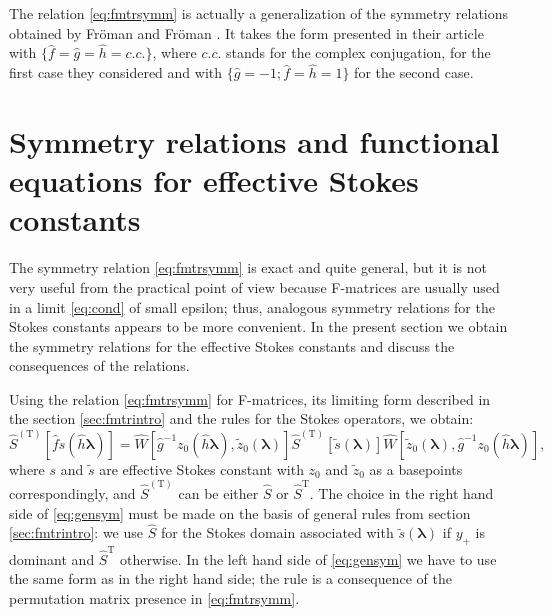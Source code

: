 \documentclass[atmp]{ipart_v1}
\def\lmbd{\bm{\lambda}}
\def\f{\hat{f}}
\def\g{\hat{g}}
\def\h{\hat{h}}
\def\S{\widehat{S}}
\def\W{\widehat{W}}
\def\T{\mathrm{T}}
\def\unity{1}
\newcommand\eref[1]{\eqref{#1}}
\newcommand\sref[1]{section \ref{#1}}
\begin{document}
The relation \eref{eq:fmtrsymm} is actually a generalization of the symmetry relations obtained by
Fr\"oman and Fr\"oman \cite{frpaper}. It takes the form presented in their article
with $\{\f = \g = \h = c.c.\}$, where $c.c.$ stands for the complex conjugation, for the
first case they considered and with $\{\g = -\unity; \f = \h = \unity\}$ for the second case.
















\section{Symmetry relations and functional equations for effective Stokes constants \label{sec:scsymm}}




The symmetry relation \eref{eq:fmtrsymm} is exact and quite general, but it is not very useful
from the practical point of view because F-matrices are usually used in a limit \eref{eq:cond} of
small epsilon; thus, analogous symmetry relations for the Stokes constants appears to be more
convenient. In the present section we obtain the symmetry relations for the effective Stokes constants 
and discuss the consequences of the relations.

Using the relation \eref{eq:fmtrsymm} for F-matrices, its limiting form described in the \sref{sec:fmtrintro} 
and the rules for the Stokes operators, we obtain:
\begin{equation}
\S^{(\T)} \left[ \f s(\h\lmbd) \right] = 
\W \left[ \g^{-1}z_0(\h\lmbd), \tilde{z}_0(\lmbd) \right]
\S^{(\T)} \left[ \tilde{s}(\lmbd) \right]
\W \left[ \tilde{z}_0(\lmbd), \g^{-1}z_0(\h\lmbd) \right],
\label{eq:gensym}
\end{equation}
where $s$ and $\tilde{s}$ are effective Stokes constant with $z_0$ and $\tilde{z}_0$ as a basepoints 
correspondingly, and $\S^{(\T)}$ can be either $\S$ or $\S^{\T}$. The choice in the right hand side 
of \eref{eq:gensym} must be made on the basis of general rules from \sref{sec:fmtrintro}: 
we use $\S$ for the Stokes domain associated with $\tilde{s}(\lmbd)$ if $y_+$ is dominant 
and $\S^{\T}$ otherwise. In the left hand side of \eref{eq:gensym} we have to use the 
same form as in the right hand side; the rule is a consequence of the permutation
matrix presence in \eref{eq:fmtrsymm}.
\end{document}
